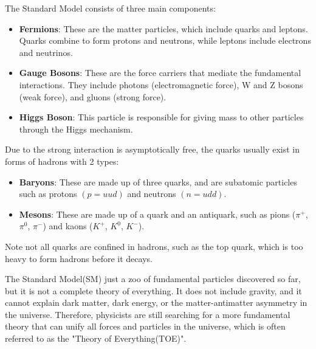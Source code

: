 \clearpage
\begin{foundation}
    The Standard Model consists of three main components:
    \begin{itemize}
        \item \textbf{Fermions}: These are the matter particles, which include quarks and leptons. Quarks combine to form protons and neutrons, while leptons include electrons and neutrinos.
        \item \textbf{Gauge Bosons}: These are the force carriers that mediate the fundamental interactions. They include photons (electromagnetic force), W and Z bosons (weak force), and gluons (strong force).
        \item \textbf{Higgs Boson}: This particle is responsible for giving mass to other particles through the Higgs mechanism.
    \end{itemize}
\end{foundation}

\bigskip\noindent
\begin{foundation}
    Due to the strong interaction is asymptotically free, the quarks usually exist in forms of hadrons with 2 types:
    \begin{itemize}
        \item \textbf{Baryons}: These are made up of three quarks, and are subatomic particles such as protons $(p = uud)$ and neutrons $(n = udd)$.
        \item \textbf{Mesons}: These are made up of a quark and an antiquark, such as pions ($\pi^+$, $\pi^0$, $\pi^-$) and kaons ($K^+$, $K^0$, $K^-$).
    \end{itemize}

    Note not all quarks are confined in hadrons, such as the top quark, which is too heavy to form hadrons before it decays.
\end{foundation}

\bigskip\noindent
\begin{remark}
    The Standard Model(SM) just a zoo of fundamental particles discovered so far, but it is not a complete theory of everything. It does not include gravity, and it cannot explain dark matter, dark energy, or the matter-antimatter asymmetry in the universe. Therefore, physicists are still searching for a more fundamental theory that can unify all forces and particles in the universe, which is often referred to as the "Theory of Everything(TOE)".
\end{remark}

\clearpage
